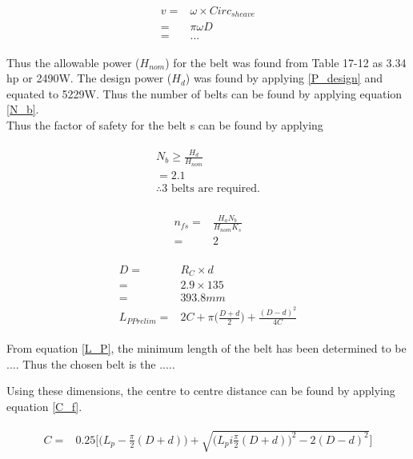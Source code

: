 \documentclass[12pt]{article}
\begin{document}
\begin{align} \label{speed}
    \begin{split}
    v =& \omega \times Circ_{sheave} \\
    =& \pi \omega D \\
    =& ... 
    \end{split}
\end{align}

Thus the allowable power ($H_{nom}$) for the belt was found from Table 17-12 as 3.34 hp or 2490W. The design power ($H_d$) was found by applying \ref{P_design} and equated to 5229W. Thus the number of belts can be found by applying equation \ref{N_b}. \\
Thus the factor of safety for the belt s can be found by applying 


\begin{align} \label{N_b}
    \begin{split}
        N_b \geq \frac{H_d}{H_{nom}} \\
        = 2.1 \\
        \therefore \text{3 belts are required.}
    \end{split}
\end{align}

\begin{align} \label{f_s}
    \begin{split}
        n_{fs} =& \frac{H_a N_b}{H_{nom} K_s} \\
        =& 2
    \end{split}
\end{align}

\begin{align} \label{L_P}
\begin{split}
    D =& R_C\times d \\
    =& 2.9 \times 135 \\
    =& 393.8mm \\ 
    L_{P Prelim} =& 2C+ \pi \bigg(\frac{D+d}{2} \bigg) + \frac{(D-d)^2}{4C}
    \end{split}
\end{align}

From equation \ref{L_P}, the minimum length of the belt has been determined to be .... Thus the chosen belt is the ..... 

Using these dimensions, the centre to centre distance can be found by applying equation \ref{C_f}. 

\begin{align} \label{C_f}
    \begin{split}
        C =& 0.25\Bigg[ \Big(L_p - \frac{\pi}{2}(D+d) \Big) + \sqrt{ \Big(L_p i \frac{\pi}{2}(D+d) \Big)^2-2(D-d)^2}\Bigg]
    \end{split}
\end{align}
\end{document}
